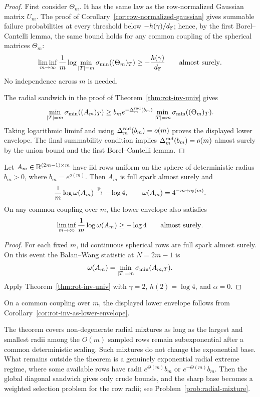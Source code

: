 \begin{proof}
First consider \(\Theta_m\).  It has the same law as the row-normalized Gaussian
matrix \(U_m\).  The proof of Corollary~\ref{cor:row-normalized-gaussian} gives
summable failure probabilities at every threshold below
\(-h(\gamma)/d_{\mathbb{F}}\); hence, by the first Borel--Cantelli lemma, the same bound
holds for any common coupling of the spherical matrices \(\Theta_m\):
\[
  \liminf_{m\to\infty}\frac1m\log
  \min_{|T|=m}\sigma_{\min}((\Theta_m)_T)
  \ge -\frac{h(\gamma)}{d_{\mathbb{F}}}
  \qquad\hbox{almost surely}.
\]
No independence across \(m\) is needed.

The radial sandwich in the proof of Theorem~\ref{thm:rot-inv-univ} gives
\[
  \min_{|T|=m}\sigma_{\min}((A_m)_T)
  \ge b_m e^{-\Delta_m^{\rm rad}(b_m)}
      \min_{|T|=m}\sigma_{\min}((\Theta_m)_T).
\]
Taking logarithmic liminf and using
\(\Delta_m^{\rm rad}(b_m)=o(m)\) proves the displayed lower envelope.  The final
summability condition implies \(\Delta_m^{\rm rad}(b_m)=o(m)\) almost surely by
the union bound and the first Borel--Cantelli lemma.
\end{proof}

\begin{corollary}\label{cor:spherical-pr}
Let \(A_m\in\mathbb{R}^{(2m-1)\times m}\) have iid rows uniform on the sphere of
deterministic radius \(b_m>0\), where \(b_m=e^{o(m)}\).  Then \(A_m\) is full
spark almost surely and
\[
  \frac1m\log\omega(A_m)\xrightarrow{\mathbb{P}}-\log4,
  \qquad
  \omega(A_m)=4^{-m+o_{\mathbb{P}}(m)}.
\]
On any common coupling over \(m\), the lower envelope also satisfies
\[
  \liminf_{m\to\infty}\frac1m\log\omega(A_m)\ge-\log4
  \qquad\hbox{almost surely}.
\]
\end{corollary}

\begin{proof}
For each fixed \(m\), iid continuous spherical rows are full spark almost surely.
On this event the Balan--Wang statistic at \(N=2m-1\) is
\[
  \omega(A_m)=\min_{|T|=m}\sigma_{\min}(A_{m,T}).
\]
Apply Theorem~\ref{thm:rot-inv-univ} with \(\gamma=2\),
\(h(2)=\log4\), and \(\alpha=0\).
\end{proof}

On a common coupling over \(m\), the displayed lower envelope follows from
Corollary~\ref{cor:rot-inv-as-lower-envelope}.

\begin{remark}\label{rem:radial-mixture}
The theorem covers non-degenerate radial mixtures as long as the largest and
smallest radii among the \(O(m)\) sampled rows remain subexponential after a
common deterministic scaling.  Such mixtures do not change the exponential
base.  What remains outside the theorem is a genuinely exponential radial
extreme regime, where some available rows have radii \(e^{\Theta(m)}b_m\) or
\(e^{-\Theta(m)}b_m\).  Then the global diagonal sandwich gives only crude
bounds, and the sharp base becomes a weighted selection problem for the row
radii; see Problem~\ref{prob:radial-mixture}.
\end{remark}
